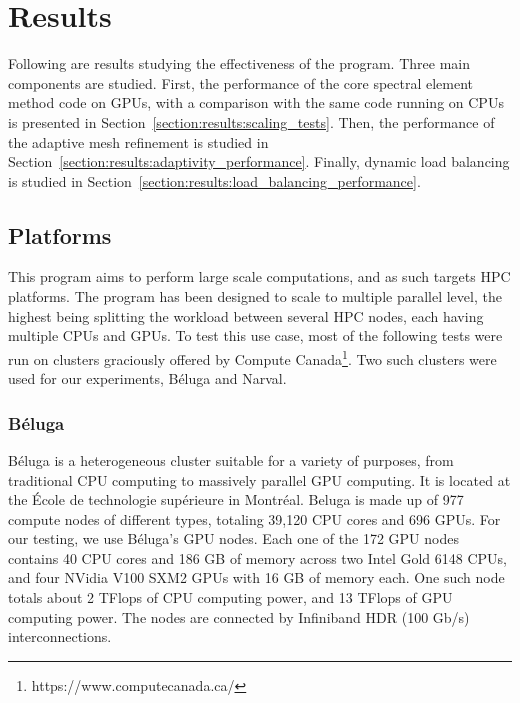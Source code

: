 \chapter{Results} \label{chapter:results}

Following are results studying the effectiveness of the program. Three main components are studied.
First, the performance of the core spectral element method code on GPUs, with a comparison with the
same code running on CPUs is presented in Section~\ref{section:results:scaling_tests}. Then, the
performance of the adaptive mesh refinement is studied in
Section~\ref{section:results:adaptivity_performance}. Finally, dynamic load balancing is studied in
Section~\ref{section:results:load_balancing_performance}.

\section{Platforms} \label{section:results:platforms}
This program aims to perform large scale computations, and as such targets HPC platforms. The
program has been designed to scale to multiple parallel level, the highest being splitting the
workload between several HPC nodes, each having multiple CPUs and GPUs. To test this use case,
most of the following tests were run on clusters graciously offered by Compute
Canada\footnote{https://www.computecanada.ca/}. Two such clusters were used for our experiments,
Béluga and Narval.

\subsection{Béluga} \label{section:results:platforms:beluga}
Béluga is a heterogeneous cluster suitable for a variety of purposes, from traditional CPU computing
to massively parallel GPU computing. It is located at the École de technologie supérieure in
Montréal. Beluga is made up of 977 compute nodes of different types, totaling 39,120 CPU cores and
696 GPUs. For our testing, we use Béluga's GPU nodes. Each one of the 172 GPU nodes contains 40 CPU
cores and 186 GB of memory across two Intel Gold 6148 CPUs, and four NVidia V100 SXM2 GPUs with 16
GB of memory each. One such node totals about 2 TFlops of CPU computing power, and 13 TFlops of GPU
computing power. The nodes are connected by Infiniband HDR (100 Gb/s) interconnections.

